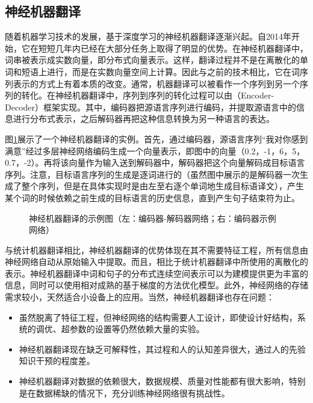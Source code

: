 \subsection{神经机器翻译}

\parinterval 随着机器学习技术的发展，基于深度学习的神经机器翻译逐渐兴起。自2014年开始，它在短短几年内已经在大部分任务上取得了明显的优势。在神经机器翻译中，词串被表示成实数向量，即分布式向量表示。这样，翻译过程并不是在离散化的单词和短语上进行，而是在实数向量空间上计算。因此与之前的技术相比，它在词序列表示的方式上有着本质的改变。通常，机器翻译可以被看作一个序列到另一个序列的转化。在神经机器翻译中，序列到序列的转化过程可以由{\small{}}（Encoder-Decoder）框架实现。其中，编码器把源语言序列进行编码，并提取源语言中的信息进行分布式表示，之后解码器再把这种信息转换为另一种语言的表达。

\parinterval 图\ref{fig:1-15}展示了一个神经机器翻译的实例。首先，通过编码器，源语言序列“我对你感到满意”经过多层神经网络编码生成一个向量表示，即图中的向量（0.2，-1，6，5，0.7，-2）。再将该向量作为输入送到解码器中，解码器把这个向量解码成目标语言序列。注意，目标语言序列的生成是逐词进行的（虽然图中展示的是解码器一次生成了整个序列，但是在具体实现时是由左至右逐个单词地生成目标语译文），产生某个词的时候依赖之前生成的目标语言的历史信息，直到产生句子结束符为止。

\begin{figure}[htp]
    \centering

    \caption{神经机器翻译的示例图（左：编码器-解码器网络；右：编码器示例网络）}
    \label{fig:1-15}
\end{figure}

\parinterval 与统计机器翻译相比，神经机器翻译的优势体现在其不需要特征工程，所有信息由神经网络自动从原始输入中提取。而且，相比于统计机器翻译中所使用的离散化的表示。神经机器翻译中词和句子的分布式连续空间表示可以为建模提供更为丰富的信息，同时可以使用相对成熟的基于梯度的方法优化模型。此外，神经网络的存储需求较小，天然适合小设备上的应用。当然，神经机器翻译也存在问题：
\begin{itemize}
\vspace{0.5em}
\item 虽然脱离了特征工程，但神经网络的结构需要人工设计，即使设计好结构，系统的调优、超参数的设置等仍然依赖大量的实验。
\vspace{0.5em}
\item 神经机器翻译现在缺乏可解释性，其过程和人的认知差异很大，通过人的先验知识干预的程度差。
\vspace{0.5em}
\item 神经机器翻译对数据的依赖很大，数据规模、质量对性能都有很大影响，特别是在数据稀缺的情况下，充分训练神经网络很有挑战性。
\vspace{0.5em}
\end{itemize}

